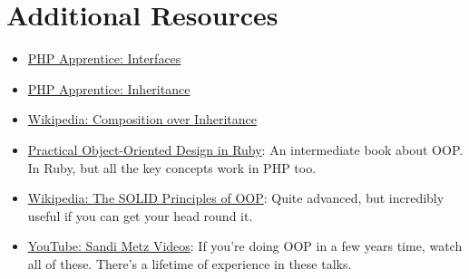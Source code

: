 \pagebreak

\section{Additional Resources}

\begin{itemize}[leftmargin=*]
    \item \href{https://phpapprentice.com/interfaces.html}{PHP Apprentice: Interfaces}
    \item \href{https://phpapprentice.com/classes-inheritance.html}{PHP Apprentice: Inheritance}
    \item \href{https://en.wikipedia.org/wiki/Composition\_over\_inheritance}{Wikipedia: Composition over Inheritance}
    \item \href{https://www.poodr.com}{Practical Object-Oriented Design in Ruby}: An intermediate book about OOP. In Ruby, but all the key concepts work in PHP too.
    \item \href{https://en.wikipedia.org/wiki/SOLID}{Wikipedia: The SOLID Principles of OOP}: Quite advanced, but incredibly useful if you can get your head round it.
    \item \href{https://www.youtube.com/channel/UCk3yOoaVtORwXipuLZ3jWNg}{YouTube: Sandi Metz Videos}: If you're doing OOP in a few years time, watch all of these. There's a lifetime of experience in these talks.
\end{itemize}
